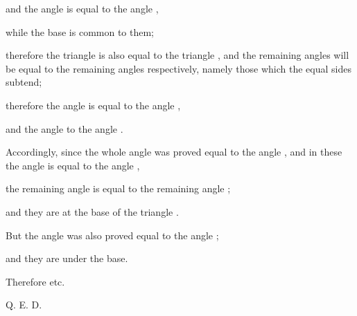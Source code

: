 \documentclass[12pt, twoside]{memoir}
\begin{document}
{{    and the angle  is equal to the angle , \par
    \nolinenumbers
    \clearpage
    \linenumbers
    while the base  is common to them; \par
    therefore the triangle  is also equal to the triangle , and the remaining angles will be equal to the remaining angles respectively, namely those which the equal sides subtend;\par
    {\centering therefore the angle  is equal to the angle , \par}
    {\centering and the angle  to the angle . \par}
    Accordingly, since the whole angle  was proved equal to the angle , and in these the angle  is equal to the angle , \par
    {\centering the remaining angle  is equal to the remaining angle ; \par}
    and they are at the base of the triangle . \par
    But the angle  was also proved equal to the angle ; \par
    and they are under the base. \par
    Therefore etc. 
}{}

\iftoggle{raum}{
    Raum_Text
}{}
\nolinenumbers
\hfill Q. E. D.

}

\resetlinenumber
\end{document}
